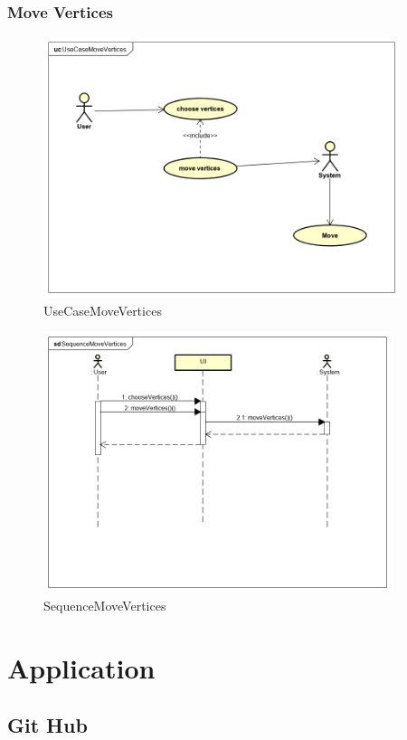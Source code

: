 \documentclass[a4paper,10pt]{article}
\begin{document}
\subsubsection{Move Vertices}
\begin{figure}[H]
		\centering
		\includegraphics[height = 3in]{UseCaseMoveVertices.png}
		\caption[Optional caption]{UseCaseMoveVertices}
		\label{fig:UseCaseMoveVertices}
	\end{figure}
	
	\begin{figure}[H]
		\centering
		\includegraphics[height = 3in]{SequenceMoveVertices.png}
		\caption[Optional caption]{SequenceMoveVertices}
		\label{fig:SequenceMoveVertices}
	\end{figure}
%


\section{Application}
\subsection{Git Hub}
\end{document}
